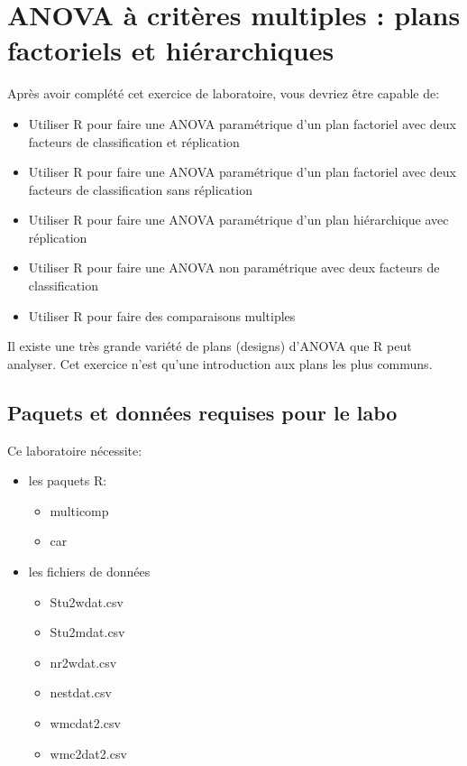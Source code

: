 \documentclass[12pt,]{book}
\providecommand{\tightlist}{%
  \setlength{\itemsep}{0pt}\setlength{\parskip}{0pt}}
\begin{document}
\hypertarget{anova-uxe0-crituxe8res-multiples-plans-factoriels-et-hiuxe9rarchiques}{%
\chapter{ANOVA à critères multiples : plans factoriels et hiérarchiques}\label{anova-uxe0-crituxe8res-multiples-plans-factoriels-et-hiuxe9rarchiques}}

Après avoir complété cet exercice de laboratoire, vous devriez être
capable de:

\begin{itemize}
\tightlist
\item
  Utiliser R pour faire une ANOVA paramétrique d'un plan factoriel avec deux facteurs de classification et réplication
\item
  Utiliser R pour faire une ANOVA paramétrique d'un plan factoriel avec deux facteurs de classification sans réplication
\item
  Utiliser R pour faire une ANOVA paramétrique d'un plan hiérarchique avec réplication
\item
  Utiliser R pour faire une ANOVA non paramétrique avec deux facteurs de classification
\item
  Utiliser R pour faire des comparaisons multiples
\end{itemize}

Il existe une très grande variété de plans (designs) d'ANOVA que R peut analyser. Cet exercice n'est qu'une introduction aux plans les plus communs.

\hypertarget{set-anomul}{%
\section{Paquets et données requises pour le labo}\label{set-anomul}}

Ce laboratoire nécessite:

\begin{itemize}
\tightlist
\item
  les paquets R:

  \begin{itemize}
  \tightlist
  \item
    multicomp
  \item
    car
  \end{itemize}
\item
  les fichiers de données

  \begin{itemize}
  \tightlist
  \item
    Stu2wdat.csv
  \item
    Stu2mdat.csv
  \item
    nr2wdat.csv
  \item
    nestdat.csv
  \item
    wmcdat2.csv
  \item
    wmc2dat2.csv
  \end{itemize}
\end{itemize}
\end{document}
